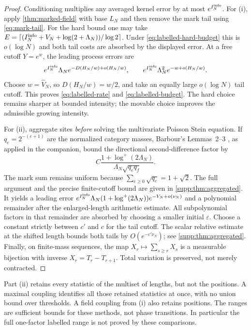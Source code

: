 \begin{proof}
Conditioning multiplies any averaged kernel error by at most
$e^{I_N^{\rm info}}$. For (i), apply \cref{thm:marked-field} with base
$L_N$ and then remove the mark tail using \eqref{eq:mark-tail}.
For the hard bound one may take
$E=\lceil(I_N^{\rm info}+V_N+\log(2+\Lambda_N))/\log2\rceil$.
Under \eqref{eq:labelled-hard-budget} this is $o(\log N)$ and both tail
costs are absorbed by the displayed error.
At a free cutoff $Y=e^w$, the leading process errors are
\[
 e^{I_N^{\rm info}}\Lambda_N e^{-D(H_N/w)+o(H_N/w)},\qquad
 e^{I_N^{\rm info}}\Lambda_N^2e^{-w+o(H_N/w)}.
\]
Choose $w=\widehat V_N$, so $D(H_N/w)=w/2$, and take an equally large
$o(\log N)$ tail cutoff. This proves \eqref{eq:labelled-rate} and
\eqref{eq:labelled-budget}. The hard choice remains sharper at bounded
intensity; the movable choice improves the admissible growing intensity.

For (ii), aggregate sites \emph{before} solving the multivariate Poisson
Stein equation. If $q_e=2^{-(e+1)}$ are the normalized category masses,
Barbour's Lemmas~2--3 \cite[p.~179]{Barbour1988SteinProcess}, as
applied in the companion, bound the directional second-difference factor by
\[
 C\frac{1+\log^+(2\Lambda_N)}{\Lambda_N\sqrt{q_eq_f}}.
\]
The mark sum remains uniform because
$\sum_{e\ge0}\sqrt{q_e}=1+\sqrt2$.
The full argument and the precise finite-cutoff bound are given in
\cref{supp:thm:aggregated}. It yields a leading error
$e^{I_N^{\rm info}}\Lambda_N(1+\log^+(2\Lambda_N))e^{-V_N+o(\nu_N)}$
and a polynomial remainder after the enlarged-length arithmetic estimate.
All subpolynomial factors in that remainder are absorbed by choosing a
smaller initial $\varepsilon$. Choose a constant strictly between $c'$ and
$c$ for the tail cutoff. The scalar relative estimate at the shifted length
bounds both tails by $O(e^{-c'\nu_N})$; see \cref{supp:thm:aggregated}.
Finally, on finite-mass sequences, the map $X_r\mapsto\sum_{s\ge r}X_s$
is a measurable bijection with inverse $X_r=T_r-T_{r+1}$. Total variation
is preserved, not merely contracted.
\end{proof}
Part (ii) retains every statistic of the multiset of lengths, but not the
positions. A maximal coupling identifies all those retained statistics at
once, with no union bound over thresholds. A field coupling from (i) also
retains positions. The ranges are sufficient bounds for these methods, not
phase transitions. In particular the full one-factor labelled range is not
proved by these comparisons.


